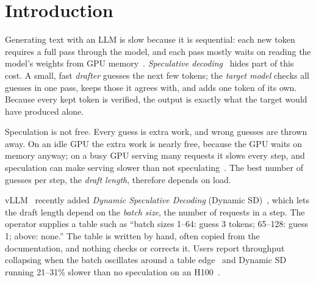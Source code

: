 \documentclass{article}
\newcommand{\term}[1]{\emph{#1}}
\begin{document}
\printAffiliationsAndNotice{}
\raggedbottom

\section{Introduction}
\label{sec:intro}

Generating text with an LLM is slow because it is sequential: each new token requires a full pass through the model, and each pass mostly waits on reading the model's weights from GPU memory~\cite{pope2023efficiently}. \term{Speculative decoding}~\cite{leviathan2023fast,chen2023accelerating} hides part of this cost. A small, fast \term{drafter} guesses the next few tokens; the \term{target model} checks all guesses in one pass, keeps those it agrees with, and adds one token of its own. Because every kept token is verified, the output is exactly what the target would have produced alone.

Speculation is not free. Every guess is extra work, and wrong guesses are thrown away. On an idle GPU the extra work is nearly free, because the GPU waits on memory anyway; on a busy GPU serving many requests it slows every step, and speculation can make serving slower than not speculating~\cite{liu2024turbospec}. The best number of guesses per step, the \term{draft length}, therefore depends on load.

vLLM~\cite{kwon2023efficient} recently added \term{Dynamic Speculative Decoding} (Dynamic SD)~\cite{vllm2026dynamicsd}, which lets the draft length depend on the \term{batch size}, the number of requests in a step. The operator supplies a table such as ``batch sizes 1--64: guess 3 tokens; 65--128: guess 1; above: none.'' The table is written by hand, often copied from the documentation, and nothing checks or corrects it. Users report throughput collapsing when the batch oscillates around a table edge~\cite{vllm2026issue49548} and Dynamic SD running 21--31\% slower than no speculation on an H100~\cite{vllm2026issue49986}.
\end{document}
